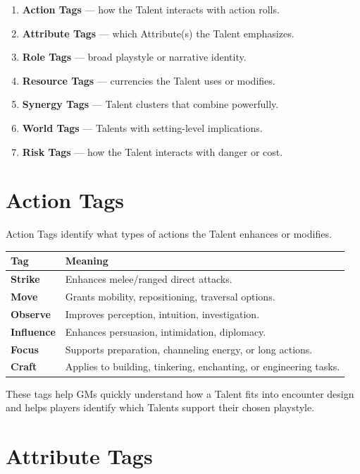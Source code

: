 \documentclass[11pt]{book}
\begin{document}
\begin{enumerate}
    \item \textbf{Action Tags} --- how the Talent interacts with action rolls.
    \item \textbf{Attribute Tags} --- which Attribute(s) the Talent emphasizes.
    \item \textbf{Role Tags} --- broad playstyle or narrative identity.
    \item \textbf{Resource Tags} --- currencies the Talent uses or modifies.
    \item \textbf{Synergy Tags} --- Talent clusters that combine powerfully.
    \item \textbf{World Tags} --- Talents with setting-level implications.
    \item \textbf{Risk Tags} --- how the Talent interacts with danger or cost.
\end{enumerate}

\section{Action Tags}

Action Tags identify what types of actions the Talent enhances or modifies.

\begin{longtable}{|p{3cm}|p{9cm}|}
\hline
\textbf{Tag} & \textbf{Meaning} \\ \hline
\textbf{Strike} & Enhances melee/ranged direct attacks. \\ \hline
\textbf{Move} & Grants mobility, repositioning, traversal options. \\ \hline
\textbf{Observe} & Improves perception, intuition, investigation. \\ \hline
\textbf{Influence} & Enhances persuasion, intimidation, diplomacy. \\ \hline
\textbf{Focus} & Supports preparation, channeling energy, or long actions. \\ \hline
\textbf{Craft} & Applies to building, tinkering, enchanting, or engineering tasks. \\ \hline
\end{longtable}

These tags help GMs quickly understand how a Talent fits into encounter design
and helps players identify which Talents support their chosen playstyle.

\section{Attribute Tags}
\end{document}
